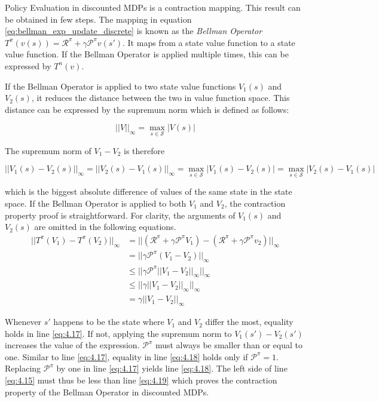 Policy Evaluation in discounted MDPs is a contraction mapping. This result can be obtained in few steps. The mapping in equation \ref{eq:bellman_exp_update_discrete} is known as the \textit{Bellman Operator} $T^\pi(v(s))=\mathcal{R}^\pi+\gamma \mathcal{P}^\pi v(s')$. It maps from a state value function to a state value function. If the Bellman Operator is applied multiple times, this can be expressed by $T^n(v)$.

If the Bellman Operator is applied to two state value functions $V_1(s)$ and $V_2(s)$, it reduces the distance between the two in value function space. This distance can be expressed by the supremum norm which is defined as follows:

\begin{equation}
||V||_\infty = \max_{s \in \mathcal{S}} |V(s)|
\end{equation}

The supremum norm of $V_1 - V_2$ is therefore

\begin{equation}
||V_1(s) - V_2(s)||_\infty = ||V_2(s) - V_1(s)||_\infty = \max_{s \in \mathcal{S}} |V_1(s)-V_2(s)| = \max_{s \in \mathcal{S}} |V_2(s)-V_1(s)|
\end{equation}

which is the biggest absolute difference of values of the same state in the state space. If the Bellman Operator is applied to both $V_1$ and $V_2$, the contraction property proof is straightforward. For clarity, the arguments of $V_1(s)$ and $V_2(s)$ are omitted in the following equations.
\begin{align}
||T^\pi(V_1)-T^\pi(V_2)||_\infty &= ||(\mathcal{R}^\pi+\gamma \mathcal{P}^\pi V_1)-(\mathcal{R}^\pi+\gamma \mathcal{P}^\pi v_2)||_\infty \label{eq:4.15}\\
&=||\gamma \mathcal{P}^\pi(V_1 - V_2)||_\infty \label{eq:4.16}\\
&\leq ||\gamma \mathcal{P}^\pi ||V_1 - V_2||_\infty ||_\infty \label{eq:4.17} \\
&\leq ||\gamma ||V_1 - V_2||_\infty ||_\infty \label{eq:4.18}\\
&=\gamma ||V_1 - V_2||_\infty \label{eq:4.19}
\end{align} 

Whenever $s'$ happens to be the state where $V_1$ and $V_2$ differ the most, equality holds in line \ref{eq:4.17}. If not, applying the supremum norm to $V_1(s')-V_2(s')$ increases the value of the expression. $\mathcal{P}^\pi$ must always be smaller than or equal to one. Similar to line \ref{eq:4.17}, equality in line \ref{eq:4.18} holds only if $\mathcal{P}^\pi=1$. Replacing $\mathcal{P}^\pi$ by one in line \ref{eq:4.17} yields line \ref{eq:4.18}. The left side of line \ref{eq:4.15} must thus be less than line \ref{eq:4.19} which proves the contraction property of the Bellman Operator in discounted MDPs.

